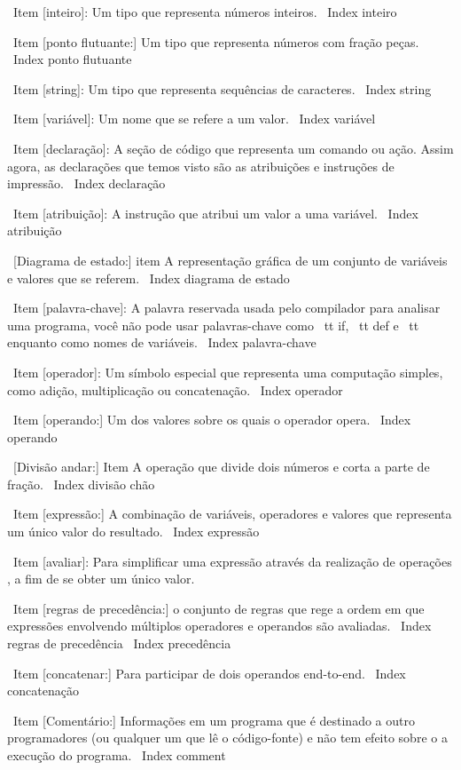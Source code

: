 \documentclass[10pt]{book}
\begin{document}
{\ Item [inteiro]: Um tipo que representa números inteiros.
\ Index {inteiro}

\ Item [ponto flutuante:] Um tipo que representa números com fração
peças.
\ Index {ponto flutuante}

\ Item [string]: Um tipo que representa sequências de caracteres.
\ Index {string}

\ Item [variável]: Um nome que se refere a um valor.
\ Index {variável}

\ Item [declaração]: A seção de código que representa um comando ou ação. Assim
agora, as declarações que temos visto são as atribuições e instruções de impressão.
\ Index {declaração}

\ Item [atribuição]: A instrução que atribui um valor a uma variável.
\ Index {atribuição}

\ [Diagrama de estado:] item A representação gráfica de um conjunto de variáveis ​​e
valores que se referem.
\ Index {diagrama de estado}

\ Item [palavra-chave]: A palavra reservada usada pelo compilador para analisar uma
programa, você não pode usar palavras-chave como {\ tt if}, {\ tt def} e {\ tt enquanto} como
nomes de variáveis.
\ Index {palavra-chave}

\ Item [operador]: Um símbolo especial que representa uma computação simples, como
adição, multiplicação ou concatenação.
\ Index {operador}

\ Item [operando:] Um dos valores sobre os quais o operador opera.
\ Index {operando}

\ [Divisão andar:] Item A operação que divide dois números e corta
a parte de fração.
\ Index {divisão chão}

\ Item [expressão:] A combinação de variáveis, operadores e valores que
representa um único valor do resultado.
\ Index {expressão}

\ Item [avaliar]: Para simplificar uma expressão através da realização de operações
, a fim de se obter um único valor.

\ Item [regras de precedência:] o conjunto de regras que rege a ordem em que
expressões envolvendo múltiplos operadores e operandos são avaliadas.
\ Index {regras de precedência}
\ Index {} precedência

\ Item [concatenar:] Para participar de dois operandos end-to-end.
\ Index {concatenação}

\ Item [Comentário:] Informações em um programa que é destinado a outro
programadores (ou qualquer um que lê o código-fonte) e não tem efeito sobre o
a execução do programa.
\ Index {comment}

}
\end{document}
